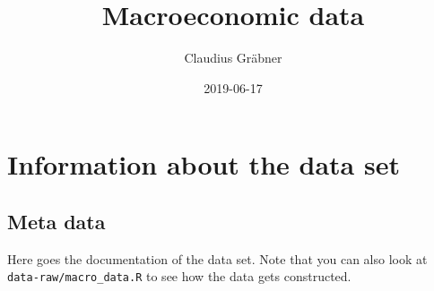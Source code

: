 \documentclass[]{article}
\title{Macroeconomic data}
\author{Claudius Gräbner}
\date{2019-06-17}
\begin{document}
\maketitle

\section{Information about the data
set}\label{information-about-the-data-set}

\subsection{Meta data}\label{meta-data}

Here goes the documentation of the data set. Note that you can also look
at \texttt{data-raw/macro\_data.R} to see how the data gets constructed.
\end{document}
